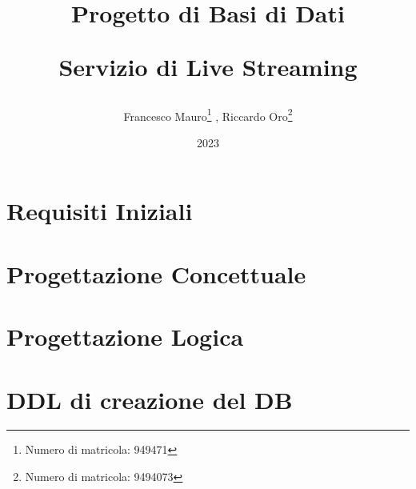 \documentclass[letterpaper]{report}
\title{ Progetto di Basi di Dati \newline \begin{center}
  \textbf{Servizio di Live Streaming}
\end{center}}
\author{Francesco Mauro\footnote{Numero di matricola: 949471} , Riccardo Oro\footnote{Numero di matricola: 9494073}}
\date{2023}
\begin{document}
\maketitle
\tableofcontents

\chapter{Requisiti Iniziali}

\chapter{Progettazione Concettuale}




\chapter{Progettazione Logica}



\chapter{DDL di creazione del DB}

\end{document}
